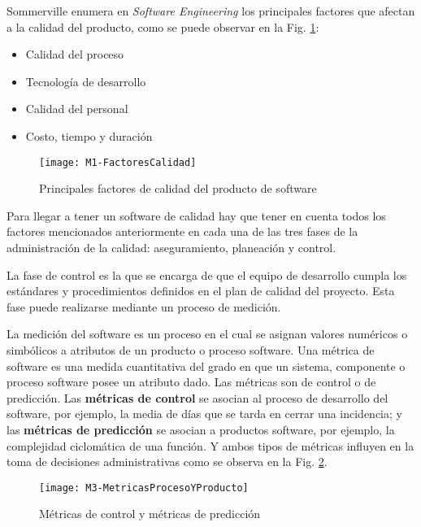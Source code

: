 Sommerville enumera en \textit{Software Engineering} \cite{sommerville_ingenierisoftware_2002} los principales factores que afectan a la calidad del producto, como se puede observar en la Fig. \ref{fig:M3-FactoresCalidad}:
\begin{itemize}
	\tightlist
	\item Calidad del proceso
	\item Tecnología de desarrollo
	\item Calidad del personal
	\item Costo, tiempo y duración
\end{itemize}
\begin{figure}[!h]
	\centering
	\texttt{[image: M1-FactoresCalidad]}
	\caption{Principales factores de calidad del producto de software\cite{sommerville_ingenierisoftware_2002}}\label{fig:M3-FactoresCalidad}
\end{figure}
\FloatBarrier


Para llegar a tener un software de calidad hay que tener en cuenta todos los factores mencionados anteriormente en cada una de las tres fases de la administración de la calidad: aseguramiento, planeación y control.

La fase de control es la que se encarga de que el equipo de desarrollo cumpla los estándares y procedimientos definidos en el plan de calidad del proyecto. Esta fase puede realizarse mediante un proceso de medición.

La medición del software es un proceso en el cual se asignan valores numéricos o simbólicos a atributos de un producto o proceso software. Una métrica de software es una medida cuantitativa del grado en que un sistema, componente o proceso software posee un atributo dado. Las métricas son de control o de predicción. Las \textbf{métricas de control} se asocian al proceso de desarrollo del software, por ejemplo, la media de días que se tarda en cerrar una incidencia; y las \textbf{métricas de predicción} se asocian a productos software, por ejemplo, la complejidad ciclomática de una función. Y ambos tipos de métricas influyen en la toma de decisiones administrativas como se observa en la Fig. \ref{fig:M3-MetricasProcesoYProducto}.
\begin{figure}[!h]
	\centering
	\texttt{[image: M3-MetricasProcesoYProducto]}
	\caption{Métricas de control y métricas de predicción\cite{sommerville_ingenierisoftware_2002}}\label{fig:M3-MetricasProcesoYProducto}
\end{figure}
